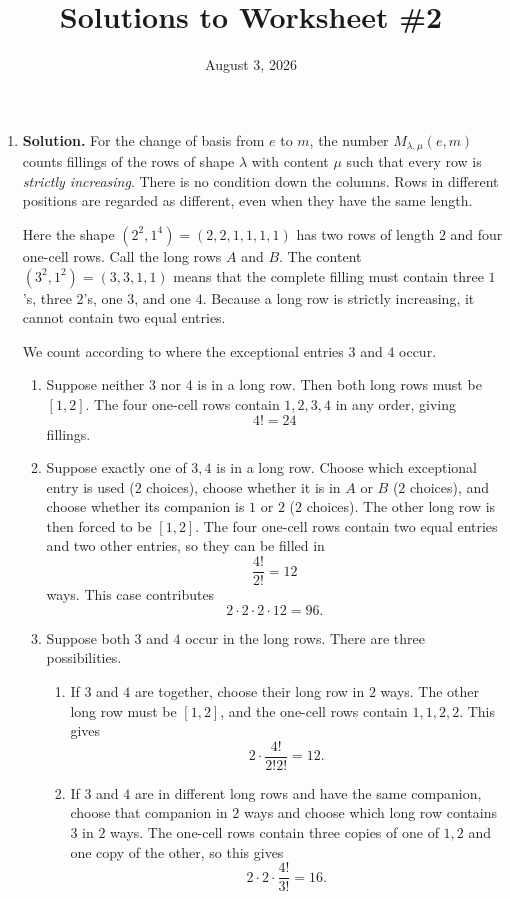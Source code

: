 \documentclass{article}
\title{Solutions to Worksheet \#2}
\author{}
\date{August 3, 2026}
\begin{document}
\maketitle
\begin{enumerate}
\item \textbf{Solution.}
For the change of basis from $e$ to $m$, the number
$M_{\lambda,\mu}(e,m)$ counts fillings of the rows of shape $\lambda$
with content $\mu$ such that every row is \emph{strictly increasing}.
There is no condition down the columns.  Rows in different positions
are regarded as different, even when they have the same length.

Here the shape $(2^2,1^4)=(2,2,1,1,1,1)$ has two rows of length $2$
and four one-cell rows.  Call the long rows $A$ and $B$.  The content
$(3^2,1^2)=(3,3,1,1)$ means that the complete filling must contain
three $1$'s, three $2$'s, one $3$, and one $4$.  Because a long row is
strictly increasing, it cannot contain two equal entries.

We count according to where the exceptional entries $3$ and $4$ occur.

\begin{enumerate}
\item Suppose neither $3$ nor $4$ is in a long row.  Then both long
rows must be $[1,2]$.  The four one-cell rows contain $1,2,3,4$ in any
order, giving
\[
4!=24
\]
fillings.

\item Suppose exactly one of $3,4$ is in a long row.  Choose which
exceptional entry is used ($2$ choices), choose whether it is in $A$
or $B$ ($2$ choices), and choose whether its companion is $1$ or $2$
($2$ choices).  The other long row is then forced to be $[1,2]$.
The four one-cell rows contain two equal entries and two other entries,
so they can be filled in
\[
\frac{4!}{2!}=12
\]
ways.  This case contributes
\[
2\cdot2\cdot2\cdot12=96.
\]

\item Suppose both $3$ and $4$ occur in the long rows.  There are
three possibilities.
\begin{enumerate}
\item If $3$ and $4$ are together, choose their long row in $2$ ways.
The other long row must be $[1,2]$, and the one-cell rows contain
$1,1,2,2$.  This gives
\[
2\cdot\frac{4!}{2!2!}=12.
\]

\item If $3$ and $4$ are in different long rows and have the same
companion, choose that companion in $2$ ways and choose which long row
contains $3$ in $2$ ways.  The one-cell rows contain three copies of
one of $1,2$ and one copy of the other, so this gives
\[
2\cdot2\cdot\frac{4!}{3!}=16.
\]


\end{enumerate}
\end{enumerate}
\end{enumerate}
\end{document}
